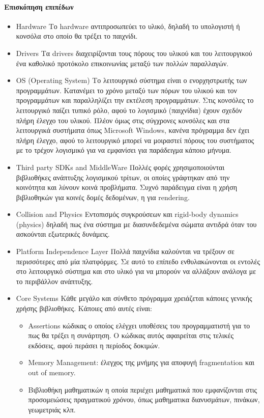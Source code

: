 \paragraph{Επισκόπηση επιπέδων}
\begin{itemize}
\item
Hardware
Το hardware αντιπροσωπεύει το υλικό, δηλαδή το υπολογιστή ή κονσόλα στο οποίο θα τρέξει το παιχνίδι.
\item
Drivers
Τα drivers διαχειρίζονται τους πόρους του υλικού και του λειτουργικού ένα καθολικό προτόκολο επικοινωνίας μεταξύ των πολλών παραλλαγών.
\item
OS (Operating System)
Το λειτουργικό σύστημα είναι ο ενορχηστρωτής των προγραμμάτων. Κατανέμει το χρόνο μεταξύ των πόρων του υλικού και τον προγραμμάτων και παραλληλίζει την εκτέλεση προγραμμάτων. Στις κονσόλες το λειτουργικό παίζει τυπικό ρόλο, αφού το λογισμικό (παιχνίδια) έχουν σχεδόν πλήρη έλεγχο του υλικού. Πλέον όμως στις σύγχρονες κονσόλες και στα λειτουργικά συστήματα όπως Microsoft Windows, κανένα πρόγραμμα δεν έχει πλήρη έλεγχο, αφού το λειτουργικό μπορεί να μοιραστεί πόρους του συστήματος με το τρέχον λογισμικό για να εμφανίσει για παράδειγμα κάποιο μήνυμα.

\item
Third party SDKs and MiddleWare
Πολλές φορές χρησιμοποιούνται βιβλιοθήκες ανάπτυξης λογισμικού τρίτων, οι οποίες γράφτηκαν από την κοινότητα και λύνουν κοινά προβλήματα. Συχνό παράδειγμα είναι η χρήση βιβλιοθηκών για κοινές δομές δεδομένων, η για rendering.

\item
Collision and Physics
Εντοπισμός συγκρούσεων και rigid-body dynamics (physics) δηλαδή πως ένα σύστημα με διασυνδεδεμένα σώματα αντιδρά όταν του ασκούνται εξωτερικές δυνάμεις.

\item
Platform Independence Layer
Πολλά παιχνίδια καλούνται να τρέξουν σε περισσότερες από μία πλατφόρμες. Σε αυτό το επίπεδο ενθυλακώνονται οι εντολές στο λειτουργικό σύστημα και στο υλικό για να μπορούν να αλλάξουν ανάλογα με το περιβάλλον ανάπτυξης.

\item
Core Systems
Κάθε μεγάλο και σύνθετο πρόγραμμα χρειάζεται κάποιες γενικής χρήσης βιβλιοθήκες. Κάποιες από αυτές είναι: 

	\begin{itemize}
	\item Assertions
	 κώδικας ο οποίος ελέγχει υποθέσεις του προγραμματιστή για το πως θα τρέξει η συνάρτηση. Ο κώδικας αυτός αφαιρείται στις τελικές εκδόσεις, αφού περάσει η περίοδος δοκιμών.
	\item Memory Management: έλεγχος της μνήμης για αποφυγή fragmentation και out of memory.
	\item Βιβλιοθήκη μαθηματικών η οποία περιέχει μαθηματικά που εμφανίζονται στις προσομειώσεις πραγματικού χρόνου, όπως μαθηματικα διανυσμάτων, πινάκων, γεωμετριάς κλπ.
	\end{itemize}


\end{itemize}
